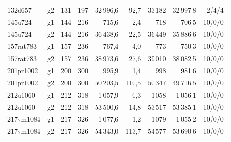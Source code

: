 \begin{longtable}{llrrrrrrr}
132d657 & g2 & 131 & 197 & 32\,996{,}6 & 92{,}7 & 33\,182 & 32\,997{,}8 & 2/4/4 \\
145u724 & g1 & 144 & 216 & 715{,}6 & 2{,}4 & 718 & 706{,}5 & 10/0/0 \\
145u724 & g2 & 144 & 216 & 36\,438{,}6 & 22{,}5 & 36\,449 & 35\,886{,}6 & 10/0/0 \\
157rat783 & g1 & 157 & 236 & 767{,}4 & 4{,}0 & 773 & 750{,}3 & 10/0/0 \\
157rat783 & g2 & 157 & 236 & 38\,973{,}6 & 27{,}6 & 39\,010 & 38\,082{,}5 & 10/0/0 \\
201pr1002 & g1 & 200 & 300 & 995{,}9 & 1{,}4 & 998 & 981{,}6 & 10/0/0 \\
201pr1002 & g2 & 200 & 300 & 50\,203{,}5 & 110{,}5 & 50\,347 & 49\,716{,}5 & 10/0/0 \\
212u1060 & g1 & 212 & 318 & 1\,057{,}9 & 0{,}3 & 1\,058 & 1\,056{,}1 & 10/0/0 \\
212u1060 & g2 & 212 & 318 & 53\,500{,}6 & 14{,}8 & 53\,517 & 53\,385{,}1 & 10/0/0 \\
217vm1084 & g1 & 217 & 326 & 1\,077{,}6 & 1{,}2 & 1\,079 & 1\,055{,}2 & 10/0/0 \\
217vm1084 & g2 & 217 & 326 & 54\,343{,}0 & 113{,}7 & 54\,577 & 53\,690{,}6 & 10/0/0 \\
\end{longtable}


